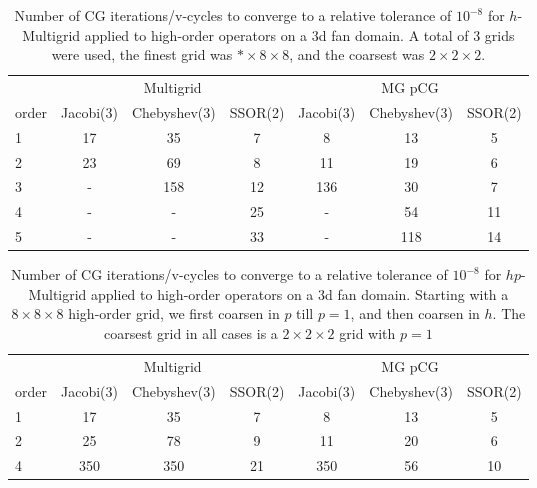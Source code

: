 \begin{table}
  \caption{\label{tab:homg} Number of CG iterations/v-cycles to converge to a relative tolerance of $10^{-8}$ for $h$-Multigrid applied to high-order operators on a 3d fan domain. A total of 3 grids were used, the finest grid was $*\times 8\times 8$, and the coarsest was $2\times 2\times 2$.}
		\centering
    \begin{tabular}{|l|c|c|c|c|c|c|} 
	    \hline
				    & \multicolumn{3}{c|}{Multigrid} & \multicolumn{3}{c|}{MG pCG}\\  \cline{2-7}
			order & \scriptsize Jacobi(3)  &\scriptsize  Chebyshev(3)  &\scriptsize SSOR(2) &\scriptsize Jacobi(3)  &\scriptsize  Chebyshev(3)  &\scriptsize SSOR(2) \\
			\hline
        1 & 17 & 35 & 7 & 8 & 13 & 5 \\
        2 & 23 & 69 & 8 & 11 & 19 & 6 \\  
        3 & -  & 158 & 12 & 136 & 30 & 7 \\
        4 & - & - & 25 & - & 54 & 11 \\
        5 & - & - & 33 & - & 118 & 14 \\ 
			\hline
	  \end{tabular}
\end{table}

\begin{table}
  \caption{\label{tab:hpmg} Number of CG iterations/v-cycles to converge to a relative tolerance of $10^{-8}$ for $hp$-Multigrid applied to high-order operators on a 3d fan domain. Starting with a $8\times 8\times 8$ high-order grid, we first coarsen in $p$ till $p=1$, and then coarsen in $h$. The coarsest grid in all cases is a $2\times 2\times 2$ grid with $p=1$}
		\centering
		\begin{tabular}{|l|c|c|c|c|c|c|} 
	    \hline
				    & \multicolumn{3}{c|}{Multigrid} & \multicolumn{3}{c|}{MG pCG}\\  \cline{2-7}
			order & \scriptsize Jacobi(3)  &\scriptsize  Chebyshev(3)  &\scriptsize SSOR(2) &\scriptsize Jacobi(3)  &\scriptsize  Chebyshev(3)  &\scriptsize SSOR(2) \\
			\hline
        1 & 17 & 35 & 7 & 8 & 13 & 5 \\
        2 & 25 & 78 & 9 & 11 & 20 & 6 \\
        4 & 350 & 350 & 21 & 350 & 56 & 10 \\
      \hline
	  \end{tabular}
\end{table}

